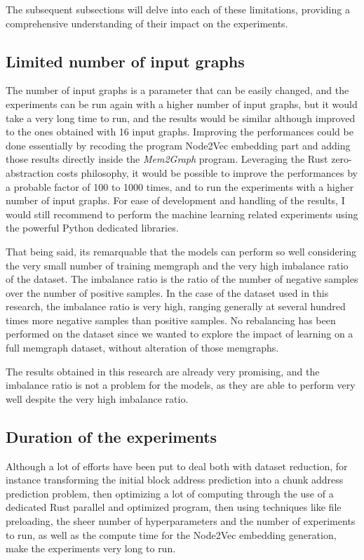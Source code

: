 The subsequent subsections will delve into each of these limitations, providing a comprehensive understanding of their impact on the experiments.

\subsection{Limited number of input graphs}
The number of input graphs is a parameter that can be easily changed, and the experiments can be run again with a higher number of input graphs, but it would take a very long time to run, and the results would be similar although improved to the ones obtained with 16 input graphs. Improving the performances could be done essentially by recoding the program Node2Vec embedding part and adding those results directly inside the \textit{Mem2Graph} program. Leveraging the Rust zero-abstraction costs philosophy, it would be possible to improve the performances by a probable factor of 100 to 1000 times, and to run the experiments with a higher number of input graphs. For ease of development and handling of the results, I would still recommend to perform the machine learning related experiments using the powerful Python dedicated libraries.

That being said, its remarquable that the models can perform so well considering the very small number of training memgraph and the very high imbalance ratio of the dataset. The imbalance ratio is the ratio of the number of negative samples over the number of positive samples. In the case of the dataset used in this research, the imbalance ratio is very high, ranging generally at several hundred times more negative samples than positive samples. No rebalancing has been performed on the dataset since we wanted to explore the impact of learning on a full memgraph dataset, without alteration of those memgraphs.

The results obtained in this research are already very promising, and the imbalance ratio is not a problem for the models, as they are able to perform very well despite the very high imbalance ratio.

\subsection{Duration of the experiments}

Although a lot of efforts have been put to deal both with dataset reduction, for instance transforming the initial block address prediction into a chunk address prediction problem, then optimizing a lot of computing through the use of a dedicated Rust parallel and optimized program, then using techniques like file preloading, the sheer number of hyperparameters and the number of experiments to run, as well as the compute time for the Node2Vec embedding generation, make the experiments very long to run. 

